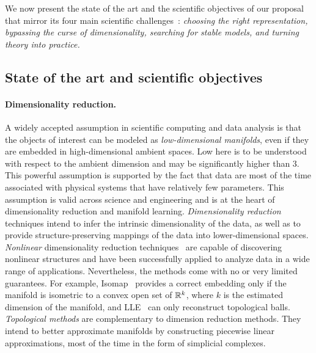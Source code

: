 We now present the state of the art and the scientific objectives of our proposal that mirror its four main scientific challenges~: {\em choosing the right representation, bypassing the curse of dimensionality, searching for stable models, and turning theory into practice.}


\subsection{State of the art and scientific objectives}

\paragraph{Dimensionality reduction.} A widely accepted assumption in scientific computing and data analysis is that the objects of interest can be modeled as {\em low-dimensional manifolds}, even if they are embedded in high-dimensional ambient spaces. Low here is to be understood with respect to the ambient dimension and may be significantly higher than 3. This powerful assumption is supported by the fact that data are most of the time associated with physical systems that have relatively few parameters.  This assumption is valid across science and engineering and is at the heart of dimensionality reduction and manifold learning.
{\em Dimensionality reduction} techniques intend to infer the intrinsic dimensionality of the data, as well as to provide structure-preserving mappings of the data into lower-dimensional spaces. {\em Nonlinear} dimensionality reduction techniques~\cite{lv-nldr-2007} are capable of discovering {nonlinear} structures and have been successfully applied to analyze data in a wide range of applications.
Nevertheless, the methods come with no or very limited guarantees. For example, Isomap~\cite{tsl-isomap-2000} provides a correct embedding only if the manifold is isometric to a convex open set of $\mathbb R ^k$, where $k$ is the estimated dimension of the manifold, and LLE~\cite{rs-lle-2000} can only reconstruct topological balls. {\em Topological methods} are complementary to dimension reduction methods. They intend to better approximate manifolds by constructing piecewise linear approximations, most of the time  in the form of simplicial complexes.

